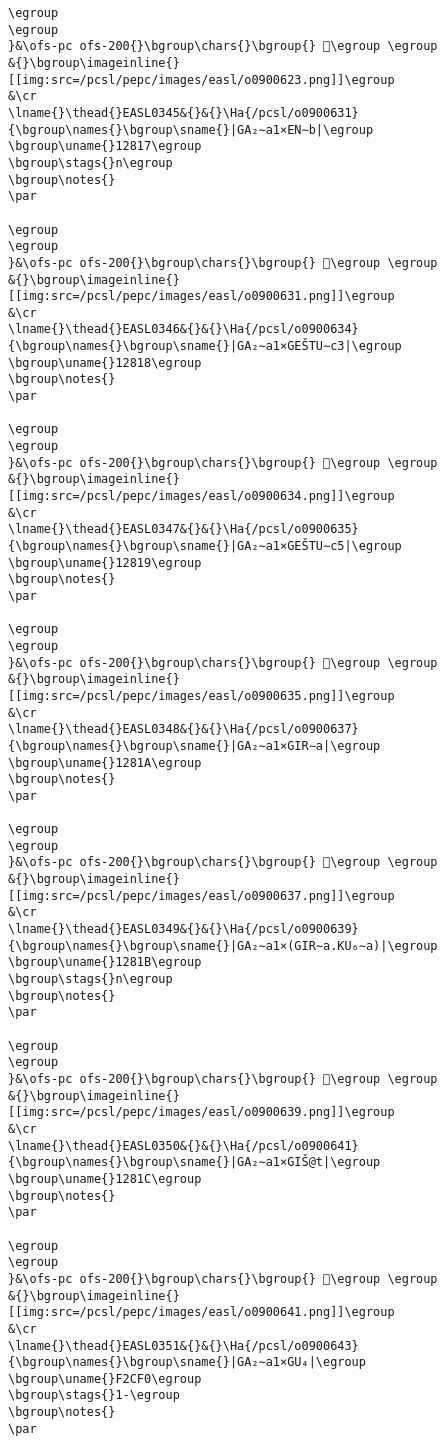 \begin{verbatim}
\egroup
\egroup
}&\ofs-pc ofs-200{}\bgroup\chars{}\bgroup{} 𒠖\egroup \egroup
&{}\bgroup\imageinline{}[[img:src=/pcsl/pepc/images/easl/o0900623.png]]\egroup
&\cr
\lname{}\thead{}EASL0345&{}&{}\Ha{/pcsl/o0900631}{\bgroup\names{}\bgroup\sname{}|GA₂∼a1×EN∼b|\egroup
\bgroup\uname{}12817\egroup
\bgroup\stags{}n\egroup
\bgroup\notes{}
\par 

\egroup
\egroup
}&\ofs-pc ofs-200{}\bgroup\chars{}\bgroup{} 𒠗\egroup \egroup
&{}\bgroup\imageinline{}[[img:src=/pcsl/pepc/images/easl/o0900631.png]]\egroup
&\cr
\lname{}\thead{}EASL0346&{}&{}\Ha{/pcsl/o0900634}{\bgroup\names{}\bgroup\sname{}|GA₂∼a1×GEŠTU∼c3|\egroup
\bgroup\uname{}12818\egroup
\bgroup\notes{}
\par 

\egroup
\egroup
}&\ofs-pc ofs-200{}\bgroup\chars{}\bgroup{} 𒠘\egroup \egroup
&{}\bgroup\imageinline{}[[img:src=/pcsl/pepc/images/easl/o0900634.png]]\egroup
&\cr
\lname{}\thead{}EASL0347&{}&{}\Ha{/pcsl/o0900635}{\bgroup\names{}\bgroup\sname{}|GA₂∼a1×GEŠTU∼c5|\egroup
\bgroup\uname{}12819\egroup
\bgroup\notes{}
\par 

\egroup
\egroup
}&\ofs-pc ofs-200{}\bgroup\chars{}\bgroup{} 𒠙\egroup \egroup
&{}\bgroup\imageinline{}[[img:src=/pcsl/pepc/images/easl/o0900635.png]]\egroup
&\cr
\lname{}\thead{}EASL0348&{}&{}\Ha{/pcsl/o0900637}{\bgroup\names{}\bgroup\sname{}|GA₂∼a1×GIR∼a|\egroup
\bgroup\uname{}1281A\egroup
\bgroup\notes{}
\par 

\egroup
\egroup
}&\ofs-pc ofs-200{}\bgroup\chars{}\bgroup{} 𒠚\egroup \egroup
&{}\bgroup\imageinline{}[[img:src=/pcsl/pepc/images/easl/o0900637.png]]\egroup
&\cr
\lname{}\thead{}EASL0349&{}&{}\Ha{/pcsl/o0900639}{\bgroup\names{}\bgroup\sname{}|GA₂∼a1×(GIR∼a.KU₆∼a)|\egroup
\bgroup\uname{}1281B\egroup
\bgroup\stags{}n\egroup
\bgroup\notes{}
\par 

\egroup
\egroup
}&\ofs-pc ofs-200{}\bgroup\chars{}\bgroup{} 𒠛\egroup \egroup
&{}\bgroup\imageinline{}[[img:src=/pcsl/pepc/images/easl/o0900639.png]]\egroup
&\cr
\lname{}\thead{}EASL0350&{}&{}\Ha{/pcsl/o0900641}{\bgroup\names{}\bgroup\sname{}|GA₂∼a1×GIŠ@t|\egroup
\bgroup\uname{}1281C\egroup
\bgroup\notes{}
\par 

\egroup
\egroup
}&\ofs-pc ofs-200{}\bgroup\chars{}\bgroup{} 𒠜\egroup \egroup
&{}\bgroup\imageinline{}[[img:src=/pcsl/pepc/images/easl/o0900641.png]]\egroup
&\cr
\lname{}\thead{}EASL0351&{}&{}\Ha{/pcsl/o0900643}{\bgroup\names{}\bgroup\sname{}|GA₂∼a1×GU₄|\egroup
\bgroup\uname{}F2CF0\egroup
\bgroup\stags{}1-\egroup
\bgroup\notes{}
\par 


\end{verbatim}
